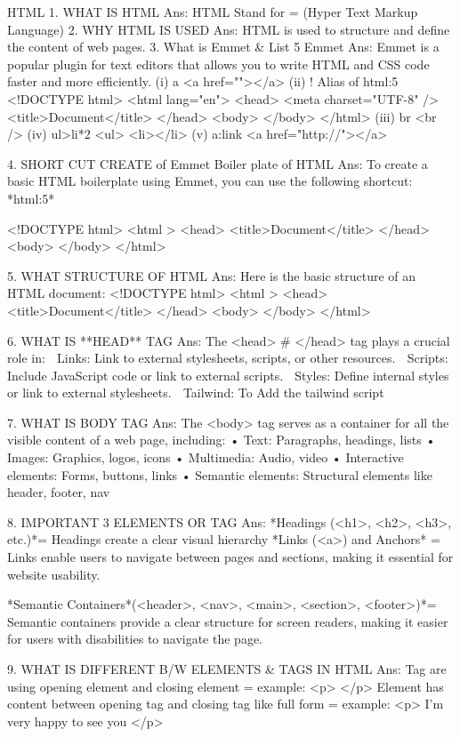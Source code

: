 HTML
1. WHAT IS HTML
Ans: HTML Stand for = (Hyper Text Markup Language)
2. WHY HTML IS USED
Ans: HTML is used to structure and define the content of web pages.
3. What is Emmet & List 5 Emmet
Ans: Emmet is a popular plugin for text editors that allows you to write HTML and CSS code faster and more efficiently.
(i) a
<a href=""></a>
 (ii) !
Alias of html:5
<!DOCTYPE html>
<html lang="en">
<head>
    <meta charset="UTF-8" />
    <title>Document</title>
</head>
<body>
</body>
</html>
(iii) br
<br />
(iv) ul>li*2
<ul>
    <li></li>
(v) a:link
<a href="http://"></a>

4. SHORT CUT CREATE of Emmet Boiler plate of HTML
Ans: To create a basic HTML boilerplate using Emmet, you can use the following shortcut:
*html:5*

<!DOCTYPE html>
<html >
<head>
  <title>Document</title>
</head>
<body>
</body>
</html>

 5. WHAT STRUCTURE OF HTML
Ans: Here is the basic structure of an HTML document:
<!DOCTYPE html>
<html >
<head>
    <title>Document</title>
</head>
<body>  
</body>
</html>

6.  WHAT IS **HEAD** TAG
Ans: The <head> # </head> tag plays a crucial role in:
	Links: Link to external stylesheets, scripts, or other resources.
	Scripts: Include JavaScript code or link to external scripts.
	Styles: Define internal styles or link to external stylesheets.
	Tailwind: To Add the tailwind script

 7. WHAT IS BODY TAG
Ans: The <body> tag serves as a container for all the visible content of a web page, including:
•	Text: Paragraphs, headings, lists
•	Images: Graphics, logos, icons 
•	Multimedia: Audio, video
•	Interactive elements: Forms, buttons, links
•	Semantic elements: Structural elements like header, footer, nav 

8.  IMPORTANT 3 ELEMENTS OR TAG
Ans: *Headings (<h1>, <h2>, <h3>, etc.)*= Headings create a clear visual hierarchy
*Links (<a>) and Anchors* = Links enable users to navigate between pages and sections, making it essential for website usability.

*Semantic Containers*(<header>, <nav>, <main>, <section>, <footer>)*= Semantic containers provide a clear structure for screen readers, making it easier for users with disabilities to navigate the page.


9.  WHAT IS DIFFERENT B/W ELEMENTS & TAGS IN HTML
Ans: Tag are using opening element and closing element = example:  <p> </p>
Element has content between opening tag and closing tag like full form = example: <p> I’m very happy to see you </p>



